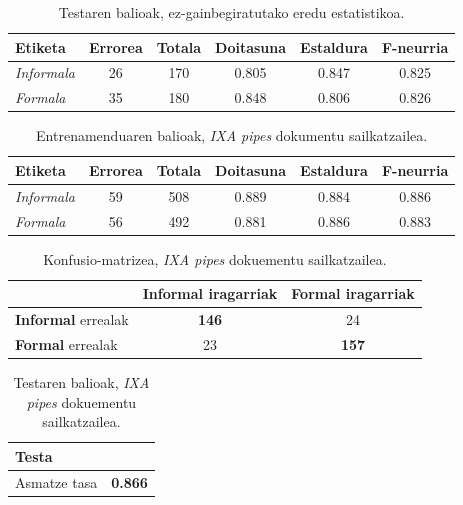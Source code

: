 \documentclass[information,article,submit,moreauthors,pdftex,10pt,a4paper]{Definitions/mdpi}
\begin{document}
\begin{table}[H]
  \centering
  \begin{tabular}{|l|c|c|c|c|c|}
    \hline
    \textbf{Etiketa} &  \textbf{Errorea} & \textbf{Totala} & \textbf{Doitasuna} & \textbf{Estaldura} & \textbf{F-neurria}\\ \hline 
    \textit{Informala} & 26 & 170 & 0.805  & 0.847  & 0.825\\ \hline 
    \textit{Formala} & 35 & 180 & 0.848 & 0.806 & 0.826\\ \hline
  \end{tabular}
  \caption{Testaren balioak, ez-gainbegiratutako eredu estatistikoa.}
  \label{tab:ez-gain ema}
\end{table}


\begin{table}[H]
  \centering
  \begin{tabular}{|l|c|c|c|c|c|}
    \hline
    \textbf{Etiketa} & \textbf{Errorea} & \textbf{Totala} & \textbf{Doitasuna} & \textbf{Estaldura} & \textbf{F-neurria}\\ \hline 
    \textit{Informala} &  59 & 508 & 0.889  & 0.884  & 0.886\\ \hline 
    \textit{Formala} &  56 & 492 & 0.881 & 0.886 & 0.883\\ \hline
  \end{tabular}
  \caption{Entrenamenduaren balioak, \textit{IXA pipes} dokumentu sailkatzailea.}
  \label{tab:ixa-ml-garapen}
\end{table}

\begin{table}[H]
  \centering
  \begin{tabular}{|l|c|c|}
    \hline  
    & \textbf{Informal} iragarriak & \textbf{Formal} iragarriak \\ \hline 
    \textbf{Informal} errealak & \textbf{146} & 24\\ \hline
    \textbf{Formal} errealak & 23 & \textbf{157}\\ \hline
  \end{tabular}
  \caption{Konfusio-matrizea, \textit{IXA pipes} dokuementu sailkatzailea.}
  \label{tab:ixa-ml-cm}
\end{table}

\begin{table}[H]
  \centering
  \begin{tabular}{|l|r|}
    \hline
    \textbf{Testa} &  \\ \hline 
    Asmatze tasa & \textbf{0.866} \\ \hline
  \end{tabular}
  \caption{Testaren balioak, \textit{IXA pipes} dokuementu sailkatzailea.}
  \label{tab:Test ixa}
\end{table}
\end{document}
